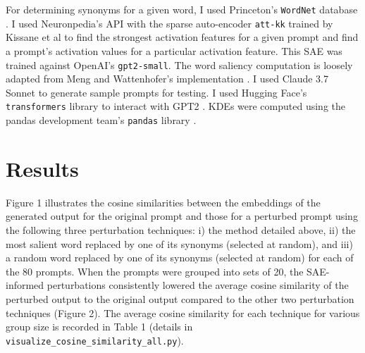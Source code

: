 \documentclass{article}
\begin{document}
For determining synonyms for a given word, I used Princeton's \texttt{WordNet} database \citep{wordnet}. I used Neuronpedia's API \citep{neuronpedia} with the sparse auto-encoder \texttt{att-kk} trained by Kissane et al \citep{attkk} to find the strongest activation features for a given prompt and find a prompt's activation values for a particular activation feature. This SAE was trained against OpenAI's \texttt{gpt2-small}. The word saliency computation is loosely adapted from Meng and Wattenhofer's implementation \citep{meng2020}. I used Claude 3.7 Sonnet to generate sample prompts for testing. I used Hugging Face's \texttt{transformers} library to interact with GPT2 \citep{wolf-etal-2020-transformers}. KDEs were computed using the pandas development team's \texttt{pandas} library \citep{pandas}.



\section*{Results}

Figure 1 illustrates the cosine similarities between the embeddings of the generated output for the original prompt and those for a perturbed prompt using the following three perturbation techniques: i) the method detailed above, ii) the most salient word replaced by one of its synonyms (selected at random), and iii) a random word replaced by one of its synonyms (selected at random) for each of the 80 prompts. When the prompts were grouped into sets of 20, the SAE-informed perturbations consistently lowered the average cosine similarity of the perturbed output to the original output compared to the other two perturbation techniques (Figure 2). The average cosine similarity for each technique for various group size is recorded in Table 1 (details in \texttt{visualize\_cosine\_similarity\_all.py}). \\ 
\end{document}
